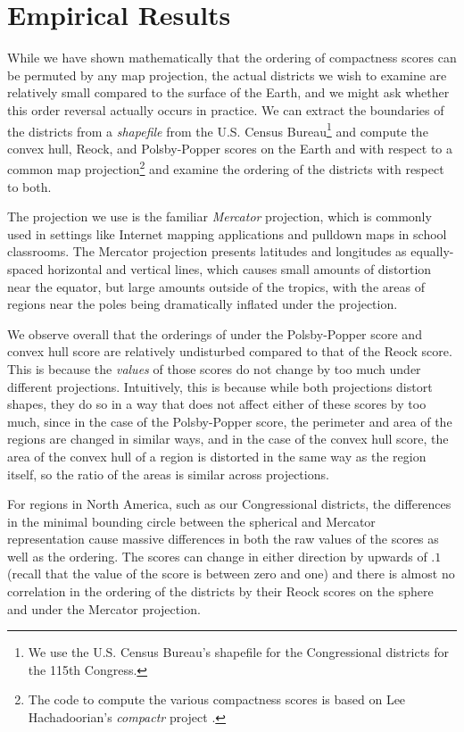 
\section{Empirical Results}\label{sec:exper}




While we have shown mathematically that the ordering of compactness scores can be permuted by any map 
projection, the actual districts we wish to examine are relatively small compared to the surface of the Earth, 
and we might ask whether this order reversal actually occurs in practice.
We can extract the boundaries of the districts from a \textit{shapefile} from the U.S. Census Bureau\footnote{We use the U.S. Census Bureau's shapefile for the Congressional districts for the 115th Congress.} and compute the convex hull, Reock, and Polsby-Popper scores on the Earth and with respect to a common map projection\footnote{The code to compute the various compactness scores is based on Lee Hachadoorian's \textit{compactr} project \cite{hachadoorian2018reock}.} and examine the ordering of the districts with respect to both.

The projection we use is the familiar \textit{Mercator} projection, which is commonly used in settings like Internet mapping applications and pulldown maps in school classrooms.  The Mercator projection presents latitudes and longitudes as equally-spaced horizontal and vertical lines, which causes small amounts of distortion near the equator, but large amounts outside of the tropics, with the areas of regions near the poles being dramatically inflated under the projection.








We observe overall that the orderings of under the Polsby-Popper score and convex hull score are relatively undisturbed compared to that of the Reock score.  This is because the \textit{values} of those scores do not change by too much under different projections.  Intuitively, this is because while both projections distort shapes, they do so in a way that does not affect either of these scores by too much, since in the case of the Polsby-Popper score, the perimeter and area of the regions are changed in similar ways, and in the case of the convex hull score, the area of the convex hull of a region is distorted in the same way as the region itself, so the ratio of the areas is similar across projections.

For regions in North America, such as our Congressional districts, the differences in the minimal bounding circle between the spherical and Mercator representation cause massive differences in both the raw values of the scores as well as the ordering.  The scores can change in either direction by upwards of $.1$ (recall that the value of the score is between zero and one) and there is almost no correlation in the ordering of the districts by their Reock scores on the sphere and under the Mercator projection. 


